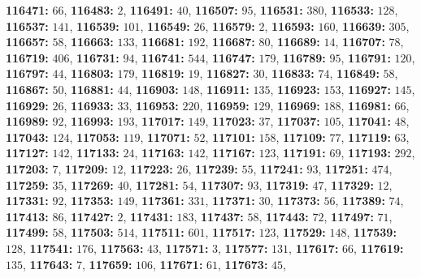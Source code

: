 \textsf{\bfseries 116471:} $66$, \textsf{\bfseries 116483:} $2$, \textsf{\bfseries 116491:} $40$, \textsf{\bfseries 116507:} $95$, \textsf{\bfseries 116531:} $380$, \textsf{\bfseries 116533:} $128$, \textsf{\bfseries 116537:} $141$, \textsf{\bfseries 116539:} $101$, \textsf{\bfseries 116549:} $26$, \textsf{\bfseries 116579:} $2$, \textsf{\bfseries 116593:} $160$, \textsf{\bfseries 116639:} $305$, \textsf{\bfseries 116657:} $58$, \textsf{\bfseries 116663:} $133$, \textsf{\bfseries 116681:} $192$, \textsf{\bfseries 116687:} $80$, \textsf{\bfseries 116689:} $14$, \textsf{\bfseries 116707:} $78$, \textsf{\bfseries 116719:} $406$, \textsf{\bfseries 116731:} $94$, \textsf{\bfseries 116741:} $544$, \textsf{\bfseries 116747:} $179$, \textsf{\bfseries 116789:} $95$, \textsf{\bfseries 116791:} $120$, \textsf{\bfseries 116797:} $44$, \textsf{\bfseries 116803:} $179$, \textsf{\bfseries 116819:} $19$, \textsf{\bfseries 116827:} $30$, \textsf{\bfseries 116833:} $74$, \textsf{\bfseries 116849:} $58$, \textsf{\bfseries 116867:} $50$, \textsf{\bfseries 116881:} $44$, \textsf{\bfseries 116903:} $148$, \textsf{\bfseries 116911:} $135$, \textsf{\bfseries 116923:} $153$, \textsf{\bfseries 116927:} $145$, \textsf{\bfseries 116929:} $26$, \textsf{\bfseries 116933:} $33$, \textsf{\bfseries 116953:} $220$, \textsf{\bfseries 116959:} $129$, \textsf{\bfseries 116969:} $188$, \textsf{\bfseries 116981:} $66$, \textsf{\bfseries 116989:} $92$, \textsf{\bfseries 116993:} $193$, \textsf{\bfseries 117017:} $149$, \textsf{\bfseries 117023:} $37$, \textsf{\bfseries 117037:} $105$, \textsf{\bfseries 117041:} $48$, \textsf{\bfseries 117043:} $124$, \textsf{\bfseries 117053:} $119$, \textsf{\bfseries 117071:} $52$, \textsf{\bfseries 117101:} $158$, \textsf{\bfseries 117109:} $77$, \textsf{\bfseries 117119:} $63$, \textsf{\bfseries 117127:} $142$, \textsf{\bfseries 117133:} $24$, \textsf{\bfseries 117163:} $142$, \textsf{\bfseries 117167:} $123$, \textsf{\bfseries 117191:} $69$, \textsf{\bfseries 117193:} $292$, \textsf{\bfseries 117203:} $7$, \textsf{\bfseries 117209:} $12$, \textsf{\bfseries 117223:} $26$, \textsf{\bfseries 117239:} $55$, \textsf{\bfseries 117241:} $93$, \textsf{\bfseries 117251:} $474$, \textsf{\bfseries 117259:} $35$, \textsf{\bfseries 117269:} $40$, \textsf{\bfseries 117281:} $54$, \textsf{\bfseries 117307:} $93$, \textsf{\bfseries 117319:} $47$, \textsf{\bfseries 117329:} $12$, \textsf{\bfseries 117331:} $92$, \textsf{\bfseries 117353:} $149$, \textsf{\bfseries 117361:} $331$, \textsf{\bfseries 117371:} $30$, \textsf{\bfseries 117373:} $56$, \textsf{\bfseries 117389:} $74$, \textsf{\bfseries 117413:} $86$, \textsf{\bfseries 117427:} $2$, \textsf{\bfseries 117431:} $183$, \textsf{\bfseries 117437:} $58$, \textsf{\bfseries 117443:} $72$, \textsf{\bfseries 117497:} $71$, \textsf{\bfseries 117499:} $58$, \textsf{\bfseries 117503:} $514$, \textsf{\bfseries 117511:} $601$, \textsf{\bfseries 117517:} $123$, \textsf{\bfseries 117529:} $148$, \textsf{\bfseries 117539:} $128$, \textsf{\bfseries 117541:} $176$, \textsf{\bfseries 117563:} $43$, \textsf{\bfseries 117571:} $3$, \textsf{\bfseries 117577:} $131$, \textsf{\bfseries 117617:} $66$, \textsf{\bfseries 117619:} $135$, \textsf{\bfseries 117643:} $7$, \textsf{\bfseries 117659:} $106$, \textsf{\bfseries 117671:} $61$, \textsf{\bfseries 117673:} $45$, 
